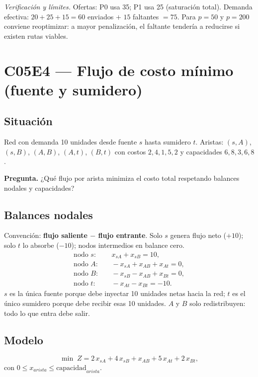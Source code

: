 \documentclass[11pt,a4paper]{article}
\newcommand{\pregunta}[1]{\noindent\textbf{Pregunta.} #1\par}
\newcommand{\verif}[1]{\noindent\small\textit{Verificación y límites.} #1\par}
\begin{document}
\verif{Ofertas: P0 usa 35; P1 usa 25 (saturación total). Demanda efectiva: $20+25+15=60$ enviados $+$ $15$ faltantes $=75$. Para $p=50$ y $p=200$ conviene reoptimizar: a mayor penalización, el faltante tendería a reducirse si existen rutas viables.}

\section{C05E4 --- Flujo de costo mínimo (fuente y sumidero)}

\subsection*{Situación}
Red con demanda 10 unidades desde fuente $s$ hasta sumidero $t$. Aristas: $(s,A)$, $(s,B)$, $(A,B)$, $(A,t)$, $(B,t)$ con costos $2,4,1,5,2$ y capacidades $6,8,3,6,8$.

\pregunta{¿Qué flujo por arista minimiza el costo total respetando balances nodales y capacidades?}

\subsection*{Balances nodales}
Convención: \textbf{flujo saliente $-$ flujo entrante}. Solo $s$ genera flujo neto ($+10$); solo $t$ lo absorbe ($-10$); nodos intermedios en balance cero.
\begin{align}
\text{nodo } s:&\quad x_{sA} + x_{sB} = 10,\\
\text{nodo } A:&\quad -x_{sA} + x_{AB} + x_{At} = 0,\\
\text{nodo } B:&\quad -x_{sB} - x_{AB} + x_{Bt} = 0,\\
\text{nodo } t:&\quad -x_{At} - x_{Bt} = -10.
\end{align}
$s$ es la única fuente porque debe inyectar 10 unidades netas hacia la red; $t$ es el único sumidero porque debe recibir esas 10 unidades. $A$ y $B$ solo redistribuyen: todo lo que entra debe salir.

\subsection*{Modelo}
\begin{equation}
\min \; Z = 2\,x_{sA} + 4\,x_{sB} + x_{AB} + 5\,x_{At} + 2\,x_{Bt},
\end{equation}
con $0\le x_{arista}\le \text{capacidad}_{arista}$.
\end{document}
